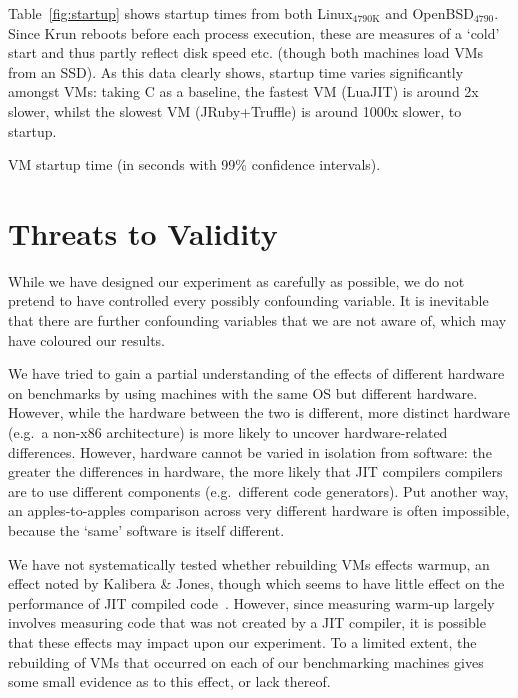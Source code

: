 \documentclass[preprint,numbers,10pt]{sigplanconf}
\newcommand{\kalibera}{Kalibera \& Jones\xspace}
\newcommand{\krun}{Krun\xspace}
\newcommand{\bencherthree}{Linux$_\mathrm{4790K}$\xspace}
\newcommand{\benchersix}{OpenBSD$_\mathrm{4790}$\xspace}
\begin{document}
Table~\ref{fig:startup} shows startup times from both \bencherthree and \benchersix. Since
\krun reboots before each process execution, these are measures of a `cold'
start and thus partly reflect disk speed etc. (though both machines load VMs
from an SSD). As this data clearly shows, startup time varies significantly amongst VMs:
taking C as a baseline, the fastest VM (LuaJIT) is around 2x slower, whilst the
slowest VM (JRuby+Truffle) is around 1000x slower, to startup.

\begin{table}[t]
\centering

\caption{VM startup time (in seconds with 99\% confidence intervals).}
\label{fig:startup}
\end{table}


\section{Threats to Validity}
\label{sec:threats}

While we have designed our experiment as carefully as possible, we do not
pretend to have controlled every possibly confounding variable. It
is inevitable that there are further confounding variables that
we are not aware of, which may have coloured our results.

We have tried to gain a partial understanding of the effects of different
hardware on benchmarks by using machines with the same OS but
different hardware. However, while the hardware between the two is
different, more distinct hardware (e.g.~a non-x86 architecture)
is more likely to uncover hardware-related differences.
However, hardware cannot be varied in isolation from software:
the greater the differences in hardware, the more likely that JIT compilers
compilers are to use different components (e.g.~different code generators).
Put another way, an apples-to-apples comparison across very different
hardware is often impossible, because the `same' software is itself different.

We have not systematically tested whether rebuilding VMs effects warmup, an
effect noted by \kalibera, though which seems to have little effect on
the performance of JIT compiled code~\cite{barrett15approaches}. However, since measuring warm-up largely
involves measuring code that was not created by a JIT compiler, it is possible
that these effects may impact upon our experiment. To a limited extent, the
rebuilding of VMs that occurred on each of our benchmarking machines gives
some small evidence as to this effect, or lack thereof.
\end{document}
